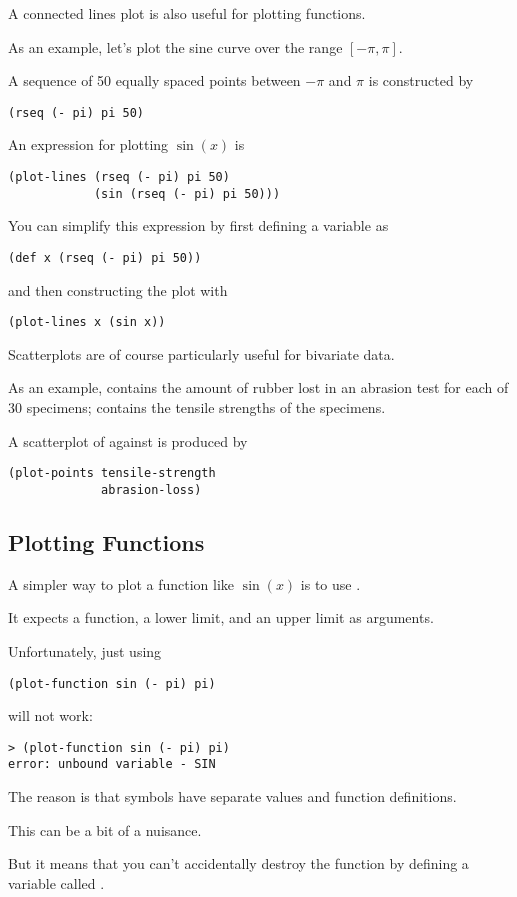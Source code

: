 \begin{slide}{}
A connected lines plot is also useful for plotting functions.

As an example, let's plot the sine curve over the range $[-\pi,\pi]$.

A sequence of 50 equally spaced points between $-\pi$ and $\pi$ is
constructed by
\begin{verbatim}
(rseq (- pi) pi 50)
\end{verbatim}
An expression for plotting $\sin(x)$ is
\begin{verbatim}
(plot-lines (rseq (- pi) pi 50)
            (sin (rseq (- pi) pi 50)))
\end{verbatim}
You can simplify this expression by first defining a variable
 as
\begin{verbatim}
(def x (rseq (- pi) pi 50))
\end{verbatim}
and then constructing the plot with
\begin{verbatim}
(plot-lines x (sin x))
\end{verbatim}
\end{slide}

\begin{slide}{}
Scatterplots are of course particularly useful for
bivariate data.

As an example,  contains the amount of rubber
lost in an abrasion test for each of 30 specimens;
 contains the tensile strengths of the
specimens.

A scatterplot of  against
 is produced by
\begin{verbatim}
(plot-points tensile-strength
             abrasion-loss)
\end{verbatim}
\end{slide}

\begin{slide}{}
\subsection{Plotting Functions}
A simpler way to plot a function like $\sin(x)$ is to use
.

It expects a function, a lower limit, and an upper limit as arguments.

Unfortunately, just using
\begin{verbatim}
(plot-function sin (- pi) pi)
\end{verbatim}
will not work:
\begin{verbatim}
> (plot-function sin (- pi) pi)
error: unbound variable - SIN
\end{verbatim}
The reason is that symbols have separate values and function
definitions.

This can be a bit of a nuisance.

But it means that you can't accidentally destroy the 
function by defining a variable called .
\end{slide}

